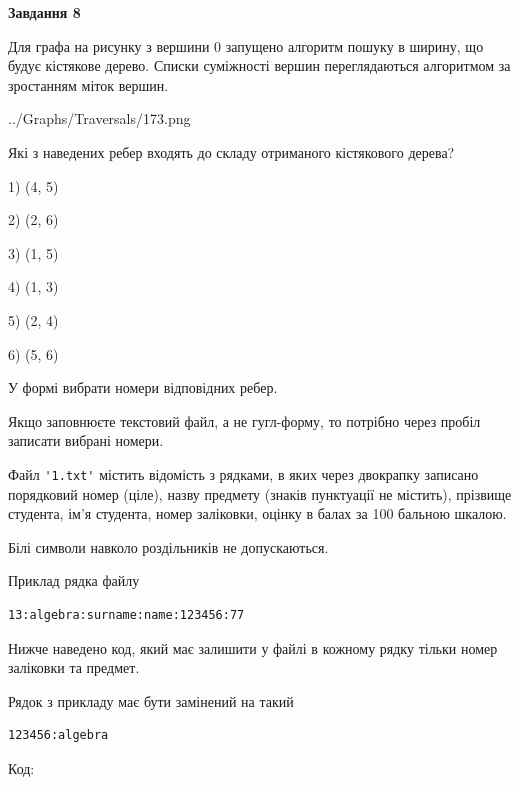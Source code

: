 \documentclass[12pt, ukrainian]{article}
\def\code#1{\Verb!#1!}
\begin{document}
{\begin {large}
{\begin {center}\textbf{Завдання 8}\end {center}}\par
Для графа на рисунку з вершини 0 запущено алгоритм пошуку в ширину, що будує кістякове дерево. Списки суміжності вершин переглядаються алгоритмом за зростанням міток вершин.\par
\begin{center}
	{../Graphs/Traversals/173.png}
\end{center}
\par Які з наведених ребер входять до складу отриманого кістякового дерева?\par
1) (4, 5)\par
2) (2, 6)\par
3) (1, 5)\par
4) (1, 3)\par
5) (2, 4)\par
6) (5, 6)\par
{\vskip 15pt} У формі вибрати номери відповідних ребер.


Якщо заповнюєте текстовий файл, а не гугл-форму, то потрібно через пробіл записа\-ти вибрані номери.\par
\newpage


Файл \code{'1.txt'} містить відомість з рядками, в яких через двокрапку записано поряд\-ковий номер (ціле), назву предмету (знаків пунктуації не містить), прізвище студента, ім'я студента, номер заліковки, оцінку в балах за 100 бальною шкалою.

Білі символи навколо роздільників не допускаються.

Приклад рядка файлу



\begin{verbatim}
13:algebra:surname:name:123456:77
\end{verbatim}


Нижче наведено код, який має залишити у файлі в кожному рядку тільки номер заліковки та предмет.

Рядок з прикладу має бути замінений на такий



\begin{verbatim}
123456:algebra
\end{verbatim}




Код:




\end{large}}
\end{document}
